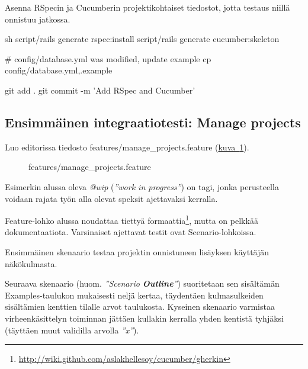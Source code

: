 \documentclass{article}
\newenvironment{myfigure}{
  \begin{figure}
    \centering
    \begin{lrbox}{\myfigurebox}
      \begin{minipage}{0.8\textwidth}
}{
      \end{minipage}
    \end{lrbox}
    \fcolorbox{blue}{blue!1}{\usebox{\myfigurebox}}
  \end{figure}
}
\newcommand{\en}[1]{\foreignlanguage{english}{#1}}
\begin{document}
\begin{samepage}
Asenna RSpecin ja Cucumberin projektikohtaiset tiedostot, jotta testaus niillä
onnistuu jatkossa.

\begin{pygmented}{sh}
script/rails generate rspec:install
script/rails generate cucumber:skeleton

# config/database.yml was modified, update example
cp config/database.yml{,.example}

git add .
git commit -m 'Add RSpec and Cucumber'
\end{pygmented}
\end{samepage}

\subsection{Ensimmäinen integraatiotesti: Manage projects}

Luo editorissa tiedosto \en{features/manage\_projects.feature}
(\hyperref[fig:manage-projects-feature]{kuva~\ref*{fig:manage-projects-feature}}).

\begin{myfigure}
\caption{\en{features/manage\_projects.feature}}
\label{fig:manage-projects-feature}
\end{myfigure}

Esimerkin alussa oleva {\em @wip} ({\em ''\en{work in progress}''}) on tagi,
jonka perusteella voidaan rajata työn alla olevat speksit ajettavaksi kerralla.

\en{Feature}-lohko alussa noudattaa tiettyä
formaattia\footnote{\url{http://wiki.github.com/aslakhellesoy/cucumber/gherkin}},
mutta on pelkkää dokumentaatiota. Varsinaiset ajettavat testit ovat
\en{Scenario}-lohkoissa.

Ensimmäinen skenaario testaa projektin onnistuneen lisäyksen käyttäjän
näkökulmasta.

Seuraava skenaario (huom. {\em ''\en{Scenario {\bf Outline}}''}) suoritetaan
sen sisältämän \en{Examples}-taulukon mukaisesti neljä kertaa, täydentäen
kulmasulkeiden sisältämien kenttien tilalle arvot taulukosta. Kyseinen
skenaario varmistaa virheenkäsittelyn toiminnan jättäen kullakin kerralla yhden
kentistä tyhjäksi (täyttäen muut validilla arvolla {\em ''x''}).
\end{document}
